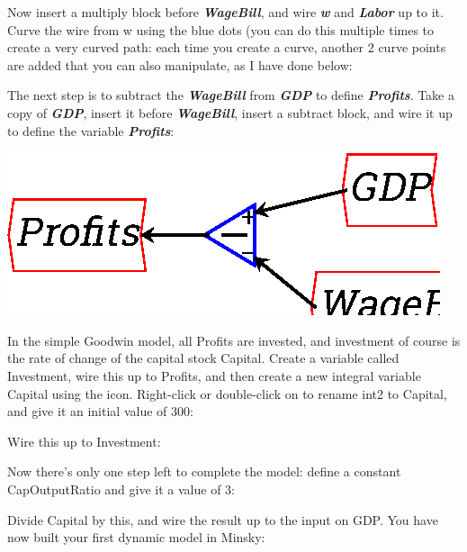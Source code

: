 \begin{center}
\end{center}

Now insert a multiply block before {\bf\em WageBill}, and wire {\bf\em
w} and {\bf\em Labor} up to it. Curve the wire from w using the blue
dots (you can do this multiple times to create a very curved path:
each time you create a curve, another 2 curve points are added that
you can also manipulate, as I have done below: 



The next step is to subtract the {\bf\em WageBill} from {\bf\em GDP}
to define {\bf\em Profits}. Take a copy of {\bf\em GDP}, insert it
before {\bf\em WageBill}, insert a subtract block, and wire it up to
define the variable {\bf\em Profits}:

\begin{center}
\includegraphics{images/NewItem100.eps}
\end{center}


In the simple Goodwin model, all Profits are invested, and investment
of course is the rate of change of the capital stock Capital. Create a
variable called Investment, wire this up to Profits, and then create a
new integral variable Capital using the 
icon. Right-click or double-click on to rename int2 to Capital, and
give it an initial value of 300: 


Wire this up to Investment:


Now there's only one step left to complete the model: define a
constant CapOutputRatio and give it a value of 3:



Divide Capital by this, and wire the result up to the input on
GDP. You have now built your first dynamic model in Minsky: 


